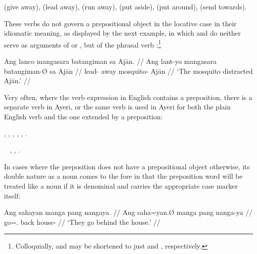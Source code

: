 \pex
\a {} (give away),
\a {} (lead away),
\a {} (run away),
\a {} (put aside),
\a {} (put around),
\a {} (send towards).
\xe

These verbs do not govern a prepositional object in the locative case in their
idiomatic meaning, as displayed by the next example, in which
 and  do neither serve as
arguments of  or , but of the phrasal
verb :\footnote{Colloquially,
 and  may be shortened to just
 and , respectively.}

\ex\begingl
	\gla Ang lanco mangasara batangiman sa Ajān. //
	\glb Ang lant-yo mangasara batangiman-Ø sa Ajān //
	\glc \AgtT{} lead-\TsgN{} away mosquito-\Top{} \Parg{} Ajān //
	\glft `The mosquito distracted Ajān.' //
\endgl\xe

Very often, where the verb expression in English contains a preposition, there 
is a separate verb in Ayeri, or the same verb is used in Ayeri for both the 
plain English verb and the one extended by a preposition:

\pex
	\a {},
	\a {},
	\a {},
	\a {},
	\a {},
	\a {}.
\xe

\pex~
	\a {},
	\a {},
	\a {}.
\xe

In cases where the preposition does not have a prepositional object otherwise,
its double nature as a noun comes to the fore in that the preposition word will
be treated like a noun if it is denominal and carries the appropriate case
marker itself:

\pex
\a\begingl
	\gla Ang sahayan manga pang nangaya. //
	\glb Ang saha=yan.Ø manga pang nanga-ya //
	\glc \AgtT{} go=\Tpl{}.\Top{} \Dyn{} back house-\Loc{} //
	\glft `They go behind the house.' //
\endgl

